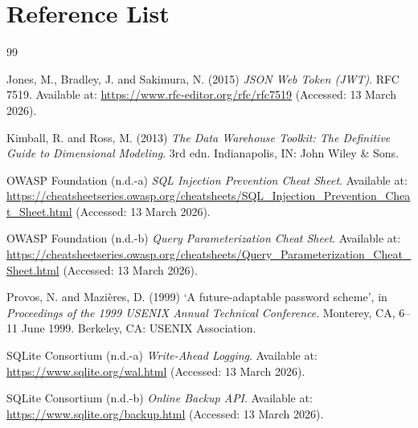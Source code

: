 \documentclass[12pt,a4paper]{article}
\begin{document}
\section*{Reference List}
\begin{thebibliography}{99}

Jones, M., Bradley, J. and Sakimura, N. (2015) \textit{JSON Web Token (JWT)}. RFC 7519. Available at: \url{https://www.rfc-editor.org/rfc/rfc7519} (Accessed: 13 March 2026).

Kimball, R. and Ross, M. (2013) \textit{The Data Warehouse Toolkit: The Definitive Guide to Dimensional Modeling}. 3rd edn. Indianapolis, IN: John Wiley \& Sons.

OWASP Foundation (n.d.-a) \textit{SQL Injection Prevention Cheat Sheet}. Available at: \url{https://cheatsheetseries.owasp.org/cheatsheets/SQL_Injection_Prevention_Cheat_Sheet.html} (Accessed: 13 March 2026).

OWASP Foundation (n.d.-b) \textit{Query Parameterization Cheat Sheet}. Available at: \url{https://cheatsheetseries.owasp.org/cheatsheets/Query_Parameterization_Cheat_Sheet.html} (Accessed: 13 March 2026).

Provos, N. and Mazi\`{e}res, D. (1999) `A future-adaptable password scheme', in \textit{Proceedings of the 1999 USENIX Annual Technical Conference}. Monterey, CA, 6--11 June 1999. Berkeley, CA: USENIX Association.

SQLite Consortium (n.d.-a) \textit{Write-Ahead Logging}. Available at: \url{https://www.sqlite.org/wal.html} (Accessed: 13 March 2026).

SQLite Consortium (n.d.-b) \textit{Online Backup API}. Available at: \url{https://www.sqlite.org/backup.html} (Accessed: 13 March 2026).

\end{thebibliography}

\appendix
\end{document}
